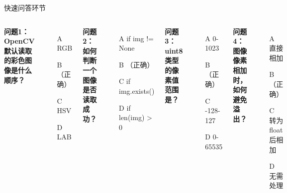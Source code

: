 \begin{frame}[fragile]{快速问答环节}
    \begin{columns}
        \textbf{问题1：OpenCV默认读取的彩色图像是什么顺序？}
        \begin{itemize}
            \item[A] RGB
            \item[B] （正确）
            \item[C] HSV
            \item[D] LAB
        \end{itemize}

        \vspace{0.3cm}
        \textbf{问题2：如何判断一个图像是否读取成功？}
        \begin{itemize}
            \item[A] if img != None
            \item[B] （正确）
            \item[C] if img.exists()
            \item[D] if len(img) > 0
        \end{itemize}

        \textbf{问题3：uint8类型的像素值范围是？}
        \begin{itemize}
            \item[A] 0-1023
            \item[B] （正确）
            \item[C] -128-127
            \item[D] 0-65535
        \end{itemize}

        \vspace{0.3cm}
        \textbf{问题4：图像像素相加时，如何避免溢出？}
        \begin{itemize}
            \item[A] 直接相加
            \item[B] （正确）
            \item[C] 转为float后相加
            \item[D] 无需处理
        \end{itemize}
    \end{columns}

    \vspace{0.5cm}
    \begin{center}
    \end{center}
\end{frame}

